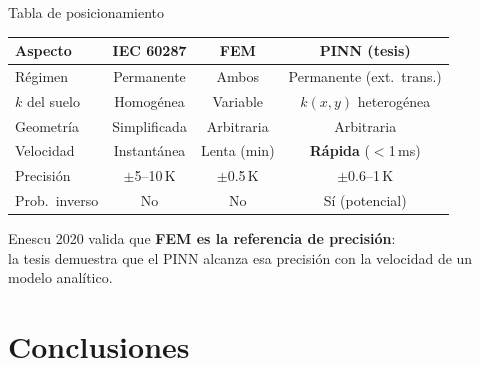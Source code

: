 \documentclass[aspectratio=169]{beamer}
\begin{document}
\begin{frame}{Tabla de posicionamiento}
  \centering\footnotesize\setlength{\tabcolsep}{4pt}
  \begin{tabular}{lccc}
    \toprule
    \textbf{Aspecto} & \textbf{IEC 60287} & \textbf{FEM} & \textbf{PINN (tesis)} \\
    \midrule
    Régimen        & Permanente     & Ambos          & Permanente (ext.\ trans.) \\
    $k$ del suelo  & Homogénea      & Variable       & $k(x,y)$ heterogénea \\
    Geometría      & Simplificada   & Arbitraria     & Arbitraria \\
    Velocidad      & Instantánea    & Lenta (min)    & \textbf{Rápida} ($<$1\,ms) \\
    Precisión      & $\pm$5--10\,K  & $\pm$0.5\,K    & $\pm$0.6--1\,K \\
    Prob.\ inverso & No             & No             & Sí (potencial) \\
    \bottomrule
  \end{tabular}
  \vspace{0.5em}
  \begin{alertblock}{}
    \centering
    Enescu 2020 valida que \textbf{FEM es la referencia de precisión}:\\
    la tesis demuestra que el PINN alcanza esa precisión
    con la velocidad de un modelo analítico.
  \end{alertblock}
\end{frame}

\section{Conclusiones}
\end{document}

